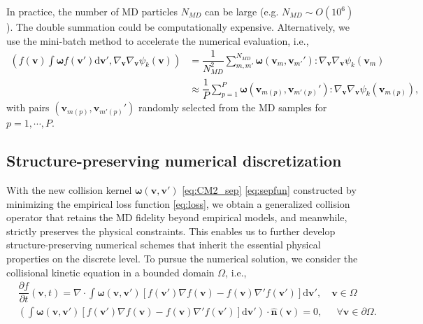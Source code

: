 \documentclass[preprint,1p,times]{elsarticle}
\theoremstyle{definition}
\theoremstyle{remark}
\newcommand{\tcr}[1]{\textcolor{black}{#1}}
\begin{document}
In practice, the number of MD particles $N_{MD}$ can be large (e.g. $N_{MD}\sim O(10^6)$). The double summation could be computationally expensive. Alternatively, we use the mini-batch method \cite{ketkar2017stochastic, li2014efficient, jin2020random, jin2021random, carrillo2021random} to accelerate the numerical evaluation, i.e., 
\tcr{
\begin{equation}\label{eq:minibatch}
    \begin{aligned}
        \left( f(\boldsymbol{v})\int \boldsymbol{\omega} f(\boldsymbol{v}')\mathrm{d}\boldsymbol{v}', \nabla_{\boldsymbol{v}} \nabla_{\boldsymbol{v}} \psi_k(\boldsymbol{v}) \right) &=
        \dfrac{1}{N_{MD}^2}\sum_{m,m'}^{N_{MD}} \boldsymbol{\omega}(\boldsymbol{v}_{m},\boldsymbol{v}_{m'} ') : \nabla_{\boldsymbol{v}} \nabla_{\boldsymbol{v}} \psi_k(\boldsymbol{v}_{m}) \\
        &\approx \dfrac{1}{P}\sum_{p=1}^{P} \boldsymbol{\omega}(\boldsymbol{v}_{m(p)},\boldsymbol{v}_{m'(p)} ') : \nabla_{\boldsymbol{v}} \nabla_{\boldsymbol{v}} \psi_k(\boldsymbol{v}_{m(p)}),
    \end{aligned}
\end{equation}
}
with pairs $(\boldsymbol{v}_{m(p)}, \boldsymbol{v}_{m'(p)} ')$ randomly selected from the MD samples for $p=1,\cdots,P$.


\subsection{Structure-preserving numerical discretization} \label{subsec:discretization}
With the new collision kernel $\boldsymbol\omega(\boldsymbol{v}, \boldsymbol{v}')$ \eqref{eq:CM2_sep} \eqref{eq:sepfun} constructed by minimizing the empirical loss function \eqref{eq:loss}, we obtain a generalized collision operator that retains the MD fidelity beyond empirical models, and meanwhile, strictly preserves the physical constraints. 
This enables us to further develop structure-preserving numerical schemes that inherit the essential physical properties on the discrete level.  To pursue the numerical solution, we consider the collisional kinetic equation in a bounded domain $\Omega$, i.e., 
\begin{equation}\label{eq:collision_symplectic_bounded}
    \begin{split}
        &\dfrac{\partial f}{\partial t}(\boldsymbol{v},t) = \nabla \cdot \int \boldsymbol{\omega}(\boldsymbol{v}, \boldsymbol{v}') \left[ f(\boldsymbol{v}') \nabla f(\boldsymbol{v}) - f(\boldsymbol{v}) \nabla' f(\boldsymbol{v}') \right] \mathrm{d}\boldsymbol{v}',  \quad \boldsymbol{v} \in \Omega \\
        &\left(  \int \boldsymbol{\omega}(\boldsymbol{v}, \boldsymbol{v}') \left[ f(\boldsymbol{v}') \nabla f(\boldsymbol{v}) - f(\boldsymbol{v}) \nabla' f(\boldsymbol{v}') \right] \mathrm{d}\boldsymbol{v}'\right) \cdot \hat{\boldsymbol{n}}(\boldsymbol{v}) = 0, ~~\quad \forall \boldsymbol{v} \in \partial\Omega.
    \end{split}
\end{equation}
\end{document}
